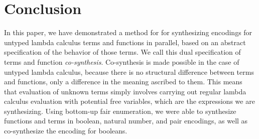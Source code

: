 \section{Conclusion}
In this paper, we have demonstrated a method for for synthesizing encodings
  for untyped lambda calculus terms and functions in parallel, based on an
  abstract specification of the behavior of those terms.
We call this dual specification of terms and function \textit{co-synthesis}.
Co-synthesis is made possible in the case of untyped lambda
  calculus, because there is no structural difference between terms and
  functions, only a difference in the meaning ascribed to them.
This means that evaluation of unknown terms simply involves carrying out
  regular lambda calculus evaluation with potential free variables, which
  are the expressions we are synthesizing.
Using bottom-up fair enumeration, we were able to synthesize functions and
  terms in boolean, natural number, and pair encodings, as well as
  co-synthesize the encoding for booleans.
